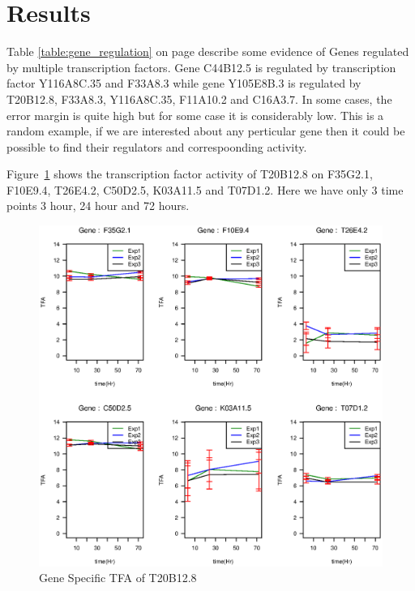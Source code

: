 \documentclass[12pt]{article}
\begin{document}
\section{Results}\label{results}

Table \ref{table:gene_regulation} on page \pageref{table:gene_regulation} describe some evidence of Genes regulated by multiple transcription
factors. Gene C44B12.5 is regulated by transcription factor Y116A8C.35 and F33A8.3 while gene Y105E8B.3 is 
regulated by T20B12.8, F33A8.3, Y116A8C.35, F11A10.2 and C16A3.7. In some cases, the error margin is quite 
high but for some case it is considerably low. This is a random example, if we are interested about any
perticular gene then it could be possible to find their regulators and correspoonding activity.

Figure~\ref{fig:T20B12.8} shows the transcription factor activity of T20B12.8 on 
F35G2.1, F10E9.4, T26E4.2, C50D2.5, K03A11.5 and T07D1.2. Here we have only 3 time points
3 hour, 24 hour and 72 hours.  


\begin{figure}[!htb]
  \includegraphics[width=1.0\linewidth]{picture/T20B12_8_3dp_CE_YH_tfid19.eps}
  \caption{Gene Specific TFA of T20B12.8}
  \label{fig:T20B12.8}
\end{figure}
\end{document}
